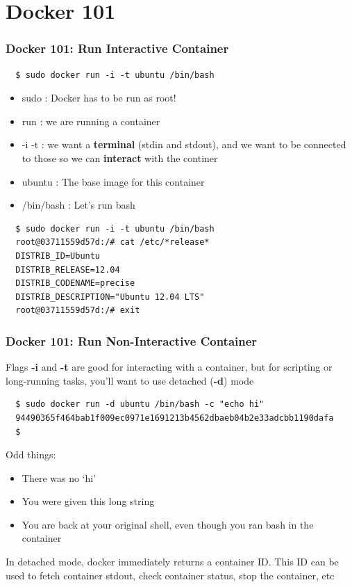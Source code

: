 \documentclass[xcolor=dvipsnames]{beamer}
\begin{document}
\section{Docker 101}
\begin{frame}[fragile]
  \frametitle{Docker 101: Run Interactive Container}

  \begin{lstlisting}
  $ sudo docker run -i -t ubuntu /bin/bash
  \end{lstlisting}

  \begin{itemize}
  \item sudo : Docker has to be run as root!
  \item run : we are running a container
  \item -i -t : we want a \textbf{terminal} (stdin and stdout), and we want to be connected to those so we can \textbf{interact} with the continer
  \item ubuntu : The base image for this container
  \item /bin/bash : Let's run bash 
  \end{itemize}


  \begin{lstlisting}
  $ sudo docker run -i -t ubuntu /bin/bash
  root@03711559d57d:/# cat /etc/*release*
  DISTRIB_ID=Ubuntu
  DISTRIB_RELEASE=12.04
  DISTRIB_CODENAME=precise
  DISTRIB_DESCRIPTION="Ubuntu 12.04 LTS"
  root@03711559d57d:/# exit
  \end{lstlisting}

\end{frame}


\begin{frame}[fragile]
  \frametitle{Docker 101: Run Non-Interactive Container}

  Flags \textbf{-i} and \textbf{-t} are good for interacting with a container, but for
  scripting or long-running tasks, you'll want to use detached (\textbf{-d}) mode

  \begin{lstlisting}
  $ sudo docker run -d ubuntu /bin/bash -c "echo hi" 
  94490365f464bab1f009ec0971e1691213b4562dbaeb04b2e33adcbb1190dafa
  $
  \end{lstlisting}

  Odd things:
  \begin{itemize}
  \item There was no `hi'
  \item You were given this long string
  \item You are back at your original shell, even though you ran bash in the container
  \end{itemize}

  In detached mode, docker immediately returns a container ID. This ID can 
  be used to fetch container stdout, check container status, stop the container, etc

\end{frame}
\end{document}
